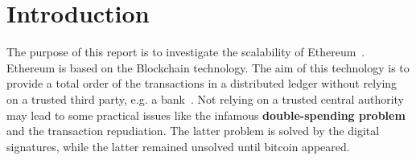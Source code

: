\section*{Introduction}

The purpose of this report is to investigate the scalability of
Ethereum~\cite{wood2018ethereum}. Ethereum is based on the Blockchain
technology. The aim of this technology is to provide a total order of the 
transactions in a distributed ledger without relying on a trusted third party, 
e.g. a bank~\cite{bib:the-quest}. Not relying on a trusted central authority
may lead to some practical issues like the infamous \textbf{double-spending
problem} and the transaction repudiation. The latter problem is solved by the
digital signatures, while the latter remained unsolved until bitcoin appeared.